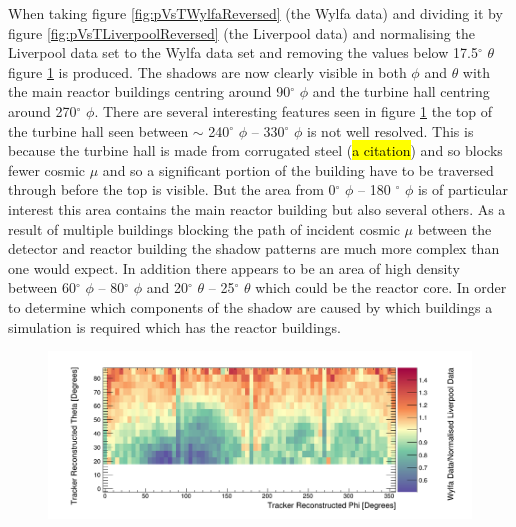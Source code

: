 When taking figure \ref{fig:pVsTWylfaReversed} (the Wylfa data) and dividing it by figure \ref{fig:pVsTLiverpoolReversed} (the Liverpool data) and normalising the Liverpool data set to the Wylfa data set and removing the values below 17.5$^\circ$ $\theta$ figure \ref{fig:measuredTrackerReconNoLines} is produced. The shadows are now clearly visible in both $\phi$ and $\theta$ with the main reactor buildings centring around 90$^\circ$ $\phi$ and the turbine hall centring around 270$^\circ$ $\phi$. There are several interesting features seen in figure \ref{fig:measuredTrackerReconNoLines} the top of the turbine hall seen between $\sim$ 240$^\circ$ $\phi$ -- 330$^\circ$ $\phi$ is not well resolved. This is because the turbine hall is made from corrugated steel (\hl{a citation}) and so blocks fewer cosmic $\mu$ and so a significant portion of the building have to be traversed through before the top is visible. But the area from 0$^\circ$ $\phi$ -- 180 $^\circ$ $\phi$ is of particular interest this area contains the main reactor building but also several others. As a result of multiple buildings blocking the path of incident cosmic $\mu$ between the detector and reactor building the shadow patterns are much more complex than one would expect. In addition there appears to be an area of high density between 60$^\circ$ $\phi$ -- 80$^\circ$ $\phi$ and 20$^\circ$ $\theta$ -- 25$^\circ$ $\theta$ which could be the reactor core. In order to determine which components of the shadow are caused by which buildings a simulation is required which has the reactor buildings.

\begin{figure}[htbp]
 \centering
 \includegraphics[width=\linewidth]{Chapter5/Figs/wylfaRasterNew/measuredTrackerReconNoLines.png}
 \label{fig:measuredTrackerReconNoLines}
\end{figure}

